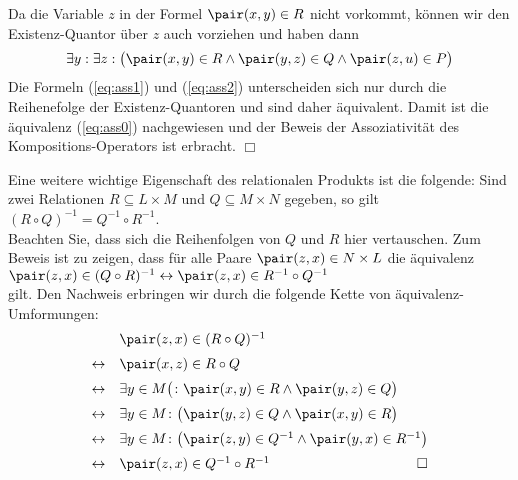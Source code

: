 Da die Variable $z$ in der Formel $\pair(x,y) \in R$ nicht vorkommt, k\"{o}nnen wir den
Existenz-Quantor \"{u}ber $z$ auch vorziehen und haben dann
\begin{equation}
  \label{eq:ass2}
  \exists y: \exists z: \bigl(\pair(x,y) \in R \wedge \pair(y,z) \in Q \wedge \pair(z,u) \in P\bigr)
\end{equation}
Die Formeln (\ref{eq:ass1}) und (\ref{eq:ass2}) unterscheiden sich nur durch die
Reihenefolge der Existenz-Quantoren und sind daher \"{a}quivalent.  Damit ist die \"{a}quivalenz
(\ref{eq:ass0}) nachgewiesen und der Beweis der Assoziativit\"{a}t des Kompositions-Operators
ist erbracht.  \hspace*{\fill} $\Box$

Eine weitere wichtige Eigenschaft des relationalen Produkts ist die folgende: Sind
zwei Relationen $R \subseteq L \times M$ und $Q \subseteq M \times N$ gegeben, so gilt \\[0.2cm]
\hspace*{1.3cm} $(R \circ Q)^{-1} = Q^{-1} \circ R^{-1}$. \\[0.2cm]
Beachten Sie, dass sich die Reihenfolgen von $Q$ und $R$ hier vertauschen.  Zum Beweis
ist zu zeigen, dass f\"{u}r alle Paare $\pair(z,x) \in N \times L$ die  \"{a}quivalenz \\[0.2cm]
\hspace*{1.3cm} $\pair(z,x) \in (Q \circ R)^{-1} \leftrightarrow \pair(z,x) \in R^{-1} \circ Q^{-1}$ \\[0.2cm]
gilt.  Den Nachweis erbringen wir durch die folgende Kette von \"{a}quivalenz-Umformungen: 
\[ 
\begin{array}{cl}
                & \pair(z,x) \in (R \circ Q)^{-1}                                             \\[0.2cm]
\leftrightarrow & \pair(x,z) \in R \circ Q                                                    \\[0.2cm]
\leftrightarrow & \exists y \in M \bigl(\colon \pair(x,y) \in R \wedge \pair(y,z) \in Q\bigr) \\[0.2cm]
\leftrightarrow & \exists y \in M \colon \bigl(\pair(y,z) \in Q \wedge \pair(x,y) \in R\bigr) \\[0.2cm]
\leftrightarrow & \exists y \in M \colon \bigl(\pair(z,y) \in Q^{-1} \wedge \pair(y,x) \in R^{-1}\bigr) 
                  \\[0.2cm]
\leftrightarrow & \pair(z,x) \in Q^{-1} \circ R^{-1}   \hspace*{\fill} \Box                                       
\end{array}
\]
\vspace{0.2cm}

